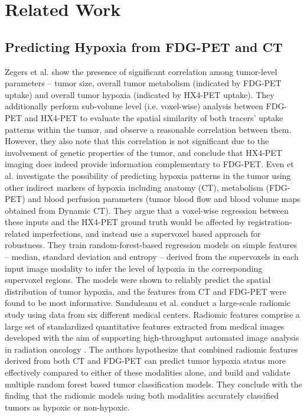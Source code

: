 \chapter{Related Work}
\label{Related_Work}

\section{Predicting Hypoxia from FDG-PET and CT}
Zegers et al. \cite{zegers2014vivo} show the presence of significant correlation among tumor-level parameters -- tumor size, overall tumor metabolism (indicated by FDG-PET uptake) and overall tumor hypoxia (indicated by HX4-PET uptake). They additionally perform sub-volume level (i.e. voxel-wise) analysis between FDG-PET and HX4-PET to evaluate the spatial similarity of both tracers' uptake patterns within the tumor, and observe a reasonable correlation between them. However, they also note that this correlation is not significant due to the involvement of genetic properties of the tumor, and conclude that HX4-PET imaging does indeed provide information complementary to FDG-PET. Even et al. \cite{even2017predicting} investigate the possibility of predicting hypoxia patterns in the tumor using other indirect markers of hypoxia including anatomy (CT), metabolism (FDG-PET) and blood perfusion parameters (tumor blood flow and blood volume maps obtained from Dynamic CT). They argue that a voxel-wise regression between these inputs and the HX4-PET ground truth would be affected by registration-related imperfections, and instead use a supervoxel based approach for robustness. They train random-forest-based regression models on simple features -- median, standard deviation and entropy -- derived from the supervoxels in each input image modality to infer the level of hypoxia in the corresponding supervoxel regions. The models were shown to reliably predict the spatial distribution of tumor hypoxia, and the features from CT and FDG-PET were found to be most informative. Sanduleanu et al. \cite{sanduleanu2020non} conduct a large-scale radiomic study using data from six different medical centers. Radiomic features comprise a large set of standardized quantitative features extracted from medical images developed with the aim of supporting high-throughput automated image analysis in radiation oncology \cite{aerts2014decoding}. The authors hypothesize that combined radiomic features derived from both CT and FDG-PET can predict tumor hypoxia status more effectively compared to either of these modalities alone, and build and validate multiple random forest based tumor classification models. They conclude with the finding that the radiomic models using both modalities accurately classified tumors as hypoxic or non-hypoxic.

